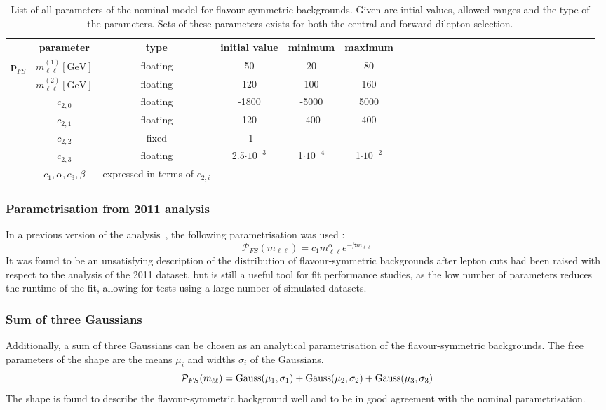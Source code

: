 \begin{table}[htbp]
\begin{center}
 \renewcommand{\arraystretch}{1.3}
 \caption{List of all parameters of the nominal model for flavour-symmetric backgrounds. Given are intial values, allowed ranges and the type of the parameters. Sets of these parameters exists for both the central and forward dilepton selection.\label{tab:Fit_Par_Overview_FS}}
\begin{tabular}{l|c|c|c|c|ccccccccccccccccccccc}
& parameter & type & initial value & minimum & maximum \\ \hline
\multirow{5}{*}{$\mathbf{p}_{FS}$} & $m_{\ell\ell}^{(1)} [\mathrm{GeV}]$ & floating & 50 & 20 & 80 \\ 
& $m_{\ell\ell}^{(2)}  [\mathrm{GeV}]$ & floating & 120 & 100 & 160 \\
& $c_{2,0}$ & floating & -1800 & -5000 & 5000 \\ 
& $c_{2,1}$ & floating & 120 & -400 & 400 \\
& $c_{2,2}$ & fixed & -1 & - & - \\
& $c_{2,3}$ & floating & 2.5$\cdot10^{-3}$ & 1$\cdot10^{-4}$ & 1$\cdot10^{-2}$ \\
& $c_{1},\alpha,c_3,\beta$ & expressed in terms of $c_{2,i}$  & - & - & - \\
\end{tabular}

\end{center}
\end{table}
\subsubsection{Parametrisation from 2011 analysis}
In a previous version of the analysis~\cite{edge2011}, the following parametrisation was used : 
\begin{equation}
\label{eq:2011}
 \mathcal{P}_{FS}(m_{\ell\ell}) = c_{1} m_{\ell\ell}^{\alpha} e^{-\beta m_{\ell\ell}}
\end{equation}
It was found to be an unsatisfying description of the distribution of flavour-symmetric backgrounds after lepton \pt cuts had been raised with respect to the analysis of the 2011 dataset, but is still a useful tool for fit performance studies, as the low number of parameters reduces the runtime of the fit, allowing for tests using a large number of simulated datasets.
\subsubsection{Sum of three Gaussians}
Additionally, a sum of three Gaussians can be chosen as an analytical parametrisation of the flavour-symmetric backgrounds. The free parameters of the shape are the means $\mu_i$ and widths $\sigma_i$ of the Gaussians.
\begin{equation*}
\mathcal{P}_{FS}(m_{\ell\ell}) = \mathrm{Gauss}(\mu_1,\sigma_1) + \mathrm{Gauss}(\mu_2,\sigma_2) + \mathrm{Gauss}(\mu_3,\sigma_3)\\
\end{equation*}
The shape is found to describe the flavour-symmetric background well and to be in good agreement with the nominal parametrisation.
